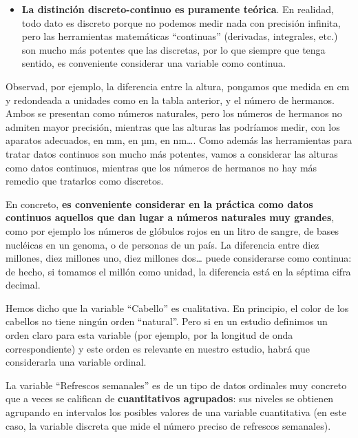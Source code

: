 \documentclass[
  spanish,
  letterpaper,
  DIV=11,
  numbers=noendperiod]{scrreprt}
\providecommand{\tightlist}{%
  \setlength{\itemsep}{0pt}\setlength{\parskip}{0pt}}
\begin{document}
\begin{itemize}
\tightlist
\item
  \textbf{La distinción discreto-continuo es puramente teórica}. En
  realidad, todo dato es discreto porque no podemos medir nada con
  precisión infinita, pero las herramientas matemáticas ``continuas''
  (derivadas, integrales, etc.) son mucho más potentes que las
  discretas, por lo que siempre que tenga sentido, es conveniente
  considerar una variable como continua.
\end{itemize}

Observad, por ejemplo, la diferencia entre la altura, pongamos que
medida en cm y redondeada a unidades como en la tabla anterior, y el
número de hermanos. Ambos se presentan como números naturales, pero los
números de hermanos no admiten mayor precisión, mientras que las alturas
las podríamos medir, con los aparatos adecuados, en mm, en µm, en
nm\ldots. Como además las herramientas para tratar datos continuos son
mucho más potentes, vamos a considerar las alturas como datos continuos,
mientras que los números de hermanos no hay más remedio que tratarlos
como discretos.

En concreto, \textbf{es conveniente considerar en la práctica como datos
continuos aquellos que dan lugar a números naturales muy grandes}, como
por ejemplo los números de glóbulos rojos en un litro de sangre, de
bases nucléicas en un genoma, o de personas de un país. La diferencia
entre diez millones, diez millones uno, diez millones dos\ldots{} puede
considerarse como continua: de hecho, si tomamos el millón como unidad,
la diferencia está en la séptima cifra decimal.

\begin{tcolorbox}[enhanced jigsaw, arc=.35mm, bottomrule=.15mm, bottomtitle=1mm, breakable, colback=white, colbacktitle=quarto-callout-note-color!10!white, colframe=quarto-callout-note-color-frame, coltitle=black, left=2mm, leftrule=.75mm, opacityback=0, opacitybacktitle=0.6, rightrule=.15mm, title=\textcolor{quarto-callout-note-color}{\faInfo}\hspace{0.5em}{Nota}, titlerule=0mm, toprule=.15mm, toptitle=1mm]

Hemos dicho que la variable ``Cabello'' es cualitativa. En principio, el
color de los cabellos no tiene ningún orden ``natural''. Pero si en un
estudio definimos un orden claro para esta variable (por ejemplo, por la
longitud de onda correspondiente) y este orden es relevante en nuestro
estudio, habrá que considerarla una variable ordinal.

La variable ``Refrescos semanales'' es de un tipo de datos ordinales muy
concreto que a veces se califican de \textbf{cuantitativos agrupados}:
sus niveles se obtienen agrupando en intervalos los posibles valores de
una variable cuantitativa (en este caso, la variable discreta que mide
el número preciso de refrescos semanales).

\end{tcolorbox}
\end{document}
